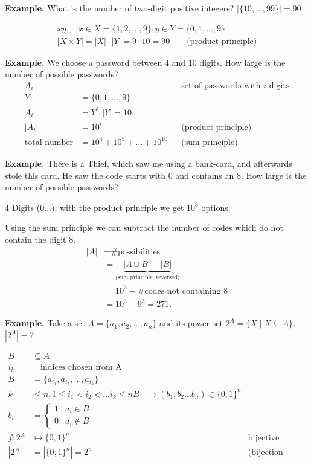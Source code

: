 \textbf{Example.}
What is the number of two-digit positive integers?
$|\{10,\ldots,99\}| = 90$

\begin{gather*}
  xy, \quad x\in X=\{1,2,\ldots ,9\}, y\in Y = \{0,1,\ldots ,9\} \\
  |X\times Y| = |X| \cdot |Y| = 9\cdot 10 = 90
    \qquad\text{(product principle)}
\end{gather*}

\textbf{Example.}
We choose a password between 4 and 10 digits. How large is the number of possible passwords?
\begin{align*}
  A_i &&& \text{set of passwords with $i$ digits} \\
  Y &= \{0,1,\ldots ,9\} \\
  A_i &= Y^i, |Y| = 10 \\
  |A_i| &= {10}^i  && \text{(product principle)} \\
  \text{total number} &= 10^4 + 10^5 + \ldots + 10^{10} && \text{(sum principle)}
\end{align*}

\textbf{Example.}
There is a Thief, which saw me using a bank-card, and afterwards stole this card. He saw the code starts with $0$ and contains an $8$. How large is the number of possible passwords?

4 Digits ($0 \ldots$), with the product principle we get $10^3$ options.

Using the sum principle we can subtract the number of codes which do not contain the digit $8$.
\begin{align*}
|A| &= \text{\# possibilities} \\
    &= \underbrace{|A\cup B| - |B|}_{\text{(sum principle, reversed)}} \\
    &= {10}^3 - \text{\# codes not containing 8} \\
    &= {10}^3 - 9^3 = 271.
\end{align*}

\textbf{Example.}
Take a set $A = \{a_1, a_2, \ldots , a_n\}$ and its power set $2^A = \{X \mid X
\subseteq A\}$. $|2^A| = ?$

\begin{align*}
  B &\subseteq A \\
  i_k &\quad\text{indices chosen from A} \\
  B &=\{a_{i_1}, a_{i_2},\ldots, a_{i_k}\} \\
  k &\leq n, 1 \leq i_1 < i_2 < \ldots i_k \leq n
    B &\mapsto
    (b_1, b_2 \ldots  b_n) \in \{0,1\}^n \\
  b_i &=
  \begin{cases}
    1 & a_i\in B \\
    0 & a_i\not\in B
  \end{cases} \\
  f: 2^A &\mapsto \{0,1\}^n &&\text{bijective mapping} \\
  |2^A| &= |\{0, 1\}^n| = 2^n
    &&\text{(bijection principle)} \\
\end{align*}

